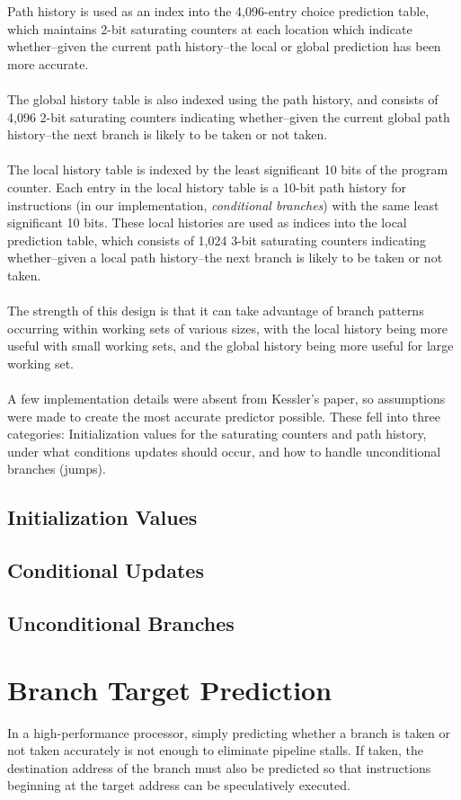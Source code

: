 \documentclass[twocolumn]{article}
\begin{document}
Path history is used as an index into the 4,096-entry choice prediction table, which maintains 2-bit saturating counters at each location which indicate whether--given the current path history--the local or global prediction has been more accurate.\\\\  
The global history table is also indexed using the path history, and consists of 4,096 2-bit saturating counters indicating whether--given the current global path history--the next branch is likely to be taken or not taken.\\\\
The local history table is indexed by the least significant 10 bits of the program counter.  Each entry in the local history table is a 10-bit path history for instructions (in our implementation, \textit{conditional branches}) with the same least significant 10 bits.  These local histories are used as indices into the local prediction table, which consists of 1,024 3-bit saturating counters indicating whether--given a local path history--the next branch is likely to be taken or not taken.\\\\
The strength of this design is that it can take advantage of branch patterns occurring within working sets of various sizes, with the local history being more useful with small working sets, and the global history being more useful for large working set.  \\\\
A few implementation details were absent from Kessler's paper, so assumptions were made to create the most accurate predictor possible.  These fell into three categories:  Initialization values for the saturating counters and path history, under what conditions updates should occur, and how to handle unconditional branches (jumps).

\subsection{Initialization Values}
\subsection{Conditional Updates}
\subsection{Unconditional Branches}

\section{Branch Target Prediction}
In a high-performance processor, simply predicting whether a branch is taken or not taken accurately is not enough to eliminate pipeline stalls.  If taken, the destination address of the branch must also be predicted so that instructions beginning at the target address can be speculatively executed. 
 
\end{document}
